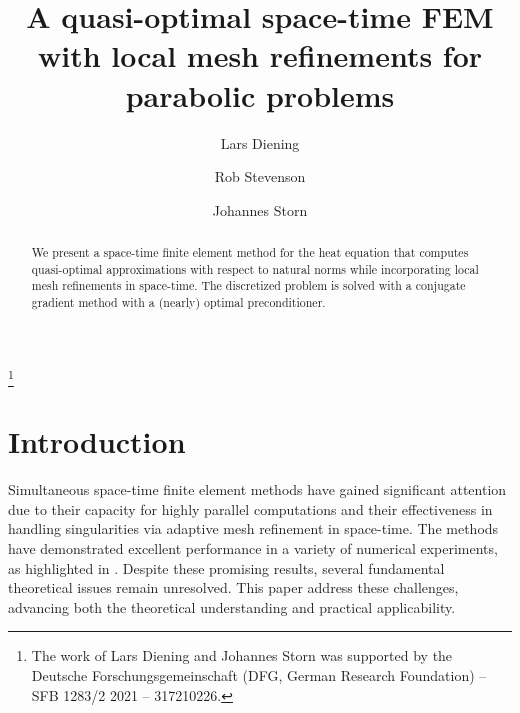 \documentclass{amsart}
\begin{document}
\author[L.\ Diening]{Lars Diening}
\author[R.\ Stevenson]{Rob Stevenson}
\author[J.\ Storn]{Johannes Storn}
\address[L.\ Diening]{Department of Mathematics, Bielefeld University, Postfach 10 01 31, 33501 Bielefeld, Germany}
\address[R.\ Stevenson]{Korteweg-de Vries (KdV) Institute for Mathematics, University of Amsterdam, PO Box 94248, 1090 GE Amsterdam, The Netherlands}
\address[J.\ Storn]{Faculty of Mathematics \& Computer Science, Institute of Mathematics, Leipzig University, Augustusplatz 10, 04109 Leipzig, Germany}
\thanks{
The work of Lars Diening and Johannes Storn was supported by the Deutsche Forschungsgemeinschaft (DFG, German
Research Foundation) – SFB 1283/2 2021 – 317210226.}



\title[Quasi-optimal FEM for parabolic problems]{A quasi-optimal space-time FEM with local mesh refinements for parabolic problems}

\begin{abstract}

We present a space-time finite element method for the heat equation that computes quasi-optimal approximations with respect to natural norms while incorporating local mesh refinements in space-time. 
The discretized problem is solved with a conjugate gradient method with a (nearly) optimal preconditioner. 
\end{abstract}

\maketitle

\section{Introduction}
Simultaneous space-time finite element methods have gained significant attention due to their capacity for highly parallel computations and their effectiveness in handling singularities via adaptive mesh refinement in space-time. The methods have demonstrated excellent performance in a variety of numerical experiments, as highlighted in \cite{VenetieWesterdiep21,LangerSchafelner22,DanwitzVoulisHostersBehr23}. Despite these promising results, several fundamental theoretical issues remain unresolved. This paper address these challenges, advancing both the theoretical understanding and practical applicability.
\end{document}
